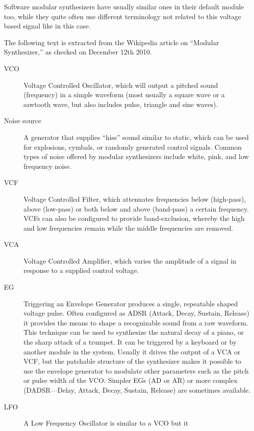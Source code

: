 \begin{mynote}
  \label{note:modsynth} Software modular synthesizers have usually
  similar ones in their default module too, while they quite often use
  different terminology not related to this voltage based signal like
  in this case.
  
  The following text is extracted from the Wikipedia
  article on ``Modular Synthesizer,'' as checked on December 12th
  2010.
 
  \begin{description}
  \item[VCO] Voltage Controlled Oscillator, which will output a
    pitched sound (frequency) in a simple waveform (most usually a
    square wave or a sawtooth wave, but also includes pulse,
    triangle and sine waves).
  \item[Noise source] A generator that supplies ``hiss'' sound similar
    to static, which can be used for explosions, cymbals, or
    randomly generated control signals. Common types of noise
    offered by modular synthesizers include white, pink, and low
    frequency noise.
  \item[VCF] Voltage Controlled Filter, which attenuates frequencies
    below (high-pass), above (low-pass) or both below and above
    (band-pass) a certain frequency. VCFs can also be configured to
    provide band-exclusion, whereby the high and low frequencies
    remain while the middle frequencies are removed.
  \item[VCA] Voltage Controlled Amplifier, which varies the
    amplitude of a signal in response to a supplied control voltage.
  \item[EG] Triggering an Envelope Generator produces a single,
    repeatable shaped voltage pulse. Often configured as ADSR
    (Attack, Decay, Sustain, Release) it provides the means to shape
    a recognizable sound from a raw waveform. This technique can be
    used to synthesize the natural decay of a piano, or the sharp
    attack of a trumpet. It can be triggered by a keyboard or by
    another module in the system. Usually it drives the output of a
    VCA or VCF, but the patchable structure of the synthesizer makes
    it possible to use the envelope generator to modulate other
    parameters such as the pitch or pulse width of the VCO. Simpler
    EGs (AD or AR) or more complex (DADSR—Delay, Attack, Decay,
    Sustain, Release) are sometimes available.
  \item[LFO] A Low Frequency Oscillator is similar to a VCO but it

\end{description}
\end{mynote}
